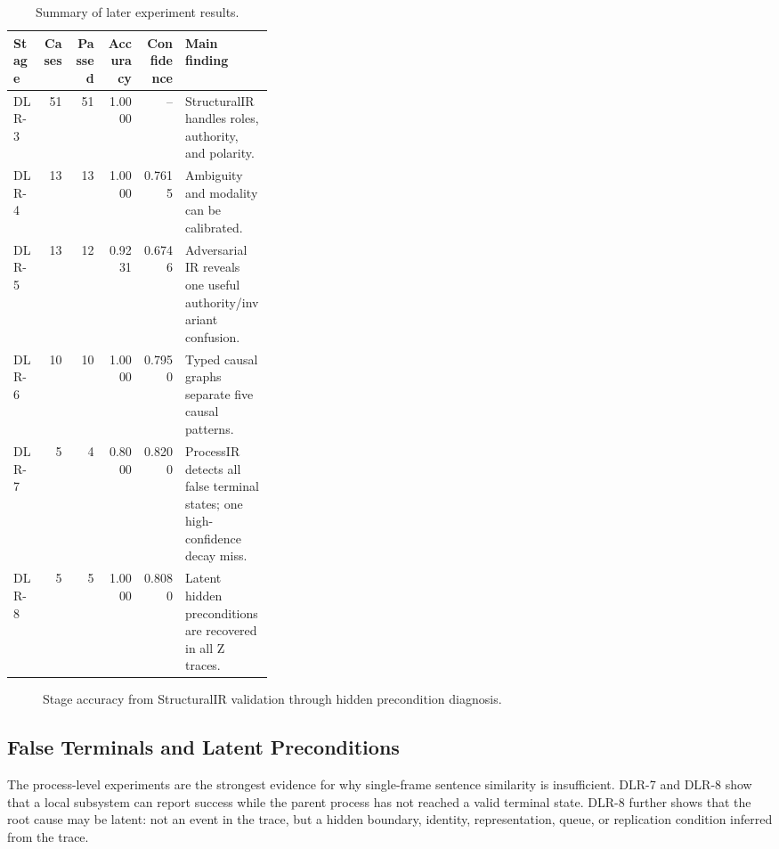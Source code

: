 \documentclass[11pt]{article}
\begin{document}
\begin{table}[h]
\centering
\caption{Summary of later experiment results.}
\small
\begin{tabular}{lrrrrp{0.34\linewidth}}
\toprule
Stage & Cases & Passed & Accuracy & Confidence & Main finding \\
\midrule
DLR-3 & 51 & 51 & 1.0000 & -- & StructuralIR handles roles, authority, and polarity. \\
DLR-4 & 13 & 13 & 1.0000 & 0.7615 & Ambiguity and modality can be calibrated. \\
DLR-5 & 13 & 12 & 0.9231 & 0.6746 & Adversarial IR reveals one useful authority/invariant confusion. \\
DLR-6 & 10 & 10 & 1.0000 & 0.7950 & Typed causal graphs separate five causal patterns. \\
DLR-7 & 5 & 4 & 0.8000 & 0.8200 & ProcessIR detects all false terminal states; one high-confidence decay miss. \\
DLR-8 & 5 & 5 & 1.0000 & 0.8080 & Latent hidden preconditions are recovered in all Z traces. \\
\bottomrule
\end{tabular}
\end{table}

\begin{figure}[h]
\centering
{}
\caption{Stage accuracy from StructuralIR validation through hidden precondition diagnosis.}
\end{figure}

\subsection{False Terminals and Latent Preconditions}

The process-level experiments are the strongest evidence for why single-frame
sentence similarity is insufficient. DLR-7 and DLR-8 show that a local subsystem
can report success while the parent process has not reached a valid terminal
state. DLR-8 further shows that the root cause may be latent: not an event in
the trace, but a hidden boundary, identity, representation, queue, or replication
condition inferred from the trace.
\end{document}
